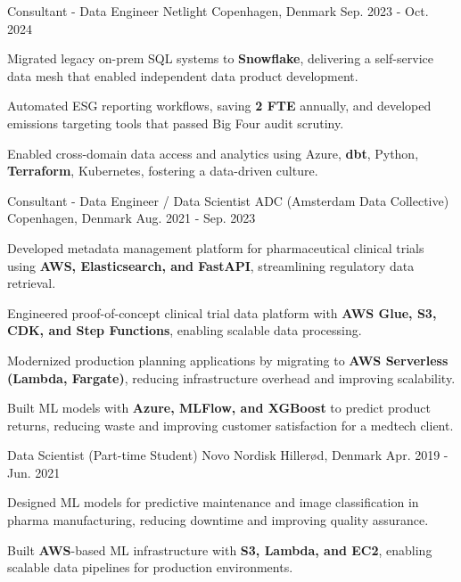 \begin{cventries}
  \cventry
    {Consultant - Data Engineer} %
    {Netlight} %
    {Copenhagen, Denmark} %
    {Sep. 2023 - Oct. 2024} %
    {
      \begin{cvitems} %
        \item {Migrated legacy on-prem SQL systems to \textbf{Snowflake}, delivering a self-service data mesh that enabled independent data product development.}
        \item {Automated ESG reporting workflows, saving \textbf{2 FTE} annually, and developed emissions targeting tools that passed Big Four audit scrutiny.}
        \item {Enabled cross-domain data access and analytics using Azure, \textbf{dbt}, Python, \textbf{Terraform}, Kubernetes, fostering a data-driven culture.}
      \end{cvitems}
    }

  \cventry
    {Consultant - Data Engineer / Data Scientist} %
    {ADC (Amsterdam Data Collective)} %
    {Copenhagen, Denmark} %
    {Aug. 2021 - Sep. 2023} %
    {
      \begin{cvitems} %
        \item {Developed metadata management platform for pharmaceutical clinical trials using \textbf{AWS, Elasticsearch, and FastAPI}, streamlining regulatory data retrieval.}
        \item {Engineered proof-of-concept clinical trial data platform with \textbf{AWS Glue, S3, CDK, and Step Functions}, enabling scalable data processing.}
        \item {Modernized production planning applications by migrating to \textbf{AWS Serverless (Lambda, Fargate)}, reducing infrastructure overhead and improving scalability.}
        \item {Built ML models with \textbf{Azure, MLFlow, and XGBoost} to predict product returns, reducing waste and improving customer satisfaction for a medtech client.}
      \end{cvitems}
    }

  \cventry
    {Data Scientist (Part-time Student)} %
    {Novo Nordisk} %
    {Hillerød, Denmark} %
    {Apr. 2019 - Jun. 2021} %
    {
      \begin{cvitems} %
        \item {Designed ML models for predictive maintenance and image classification in pharma manufacturing, reducing downtime and improving quality assurance.}
        \item {Built \textbf{AWS}-based ML infrastructure with \textbf{S3, Lambda, and EC2}, enabling scalable data pipelines for production environments.}
      \end{cvitems}
    }

\end{cventries}

